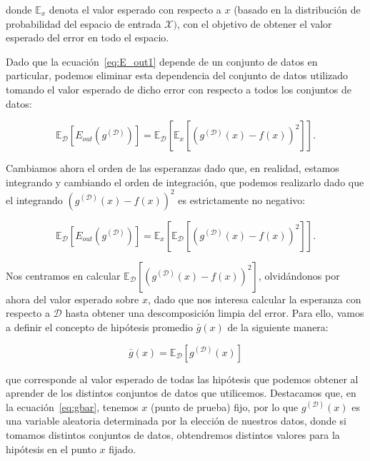 donde $\mathbb{E}_{x}$ denota el valor esperado con respecto a $x$ (basado en la distribución de probabilidad del espacio de entrada $\mathcal{X})$, con el objetivo de obtener el valor esperado del error en todo el espacio.\newline

Dado que la ecuación~\eqref{eq:E_out1} depende de un conjunto de datos en particular, podemos eliminar esta dependencia del conjunto de datos utilizado tomando el valor esperado de dicho error con respecto a todos los conjuntos de datos:

\begin{equation}\label{eq:E_out2}
    \mathbb{E}_{\mathcal{D}}[E_{out}(g^{\mathcal{(D)}})] = \mathbb{E}_{\mathcal{D}}[\mathbb{E}_{x}[{(g^{\mathcal{(D)}}(x) - f(x))}^2]]. 
\end{equation}\newline

Cambiamos ahora el orden de las esperanzas dado que, en realidad, estamos integrando y cambiando el orden de integración, que podemos realizarlo dado que el integrando ${(g^{\mathcal{(D)}}(x) - f(x))}^2$ es estrictamente no negativo:

\begin{equation}\label{eq:E_out3}
    \mathbb{E}_{\mathcal{D}}[E_{out}(g^{\mathcal{(D)}})] = \mathbb{E}_{x}[\mathbb{E}_{\mathcal{D}}[{(g^{\mathcal{(D)}}(x) - f(x))}^2]].
\end{equation}\newline

Nos centramos en calcular $\mathbb{E}_{\mathcal{D}}[{(g^{\mathcal{(D)}}(x) - f(x))}^2]$, olvidándonos por ahora del valor esperado sobre $x$, dado que nos interesa calcular la esperanza con respecto a $\mathcal{D}$ hasta obtener una descomposición limpia del error. Para ello, vamos a definir el concepto de hipótesis promedio $\bar{g}(x)$ de la siguiente manera:

\begin{equation}\label{eq:gbar}
    \bar{g}(x) = \mathbb{E}_{\mathcal{D}}[g^{\mathcal{(D)}}(x)]
\end{equation}

que corresponde al valor esperado de todas las hipótesis que podemos obtener al aprender de los distintos conjuntos de datos que utilicemos. Destacamos que, en la ecuación~\eqref{eq:gbar}, tenemos $x$ (punto de prueba) fijo, por lo que $g^{\mathcal{(D)}}(x)$ es una variable aleatoria determinada por la elección de nuestros datos, donde si tomamos distintos conjuntos de datos, obtendremos distintos valores para la hipótesis en el punto $x$ fijado.\newline 


